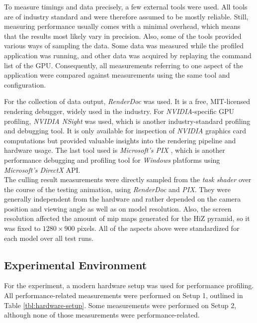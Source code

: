 To measure timings and data precisely, a few external tools were used. All tools are of industry standard 
and were therefore assumed to be mostly reliable. Still, measuring performance usually comes with a minimal 
overhead, which means that the results most likely vary in precision. Also, some of the tools provided 
various ways of sampling the data. Some data was measured while the profiled application was running, and 
other data was acquired by replaying the command list of the \ac{GPU}. Consequently, all measurements 
referring to one aspect of the application were compared against measurements using the same tool and 
configuration. \\
\enlargethispage{\baselineskip}
\enlargethispage{\baselineskip}

\noindent
For the collection of data output, \emph{RenderDoc} \cite{RenderDoc} was used. It is a free, MIT-licensed 
rendering debugger, widely used in the industry. For \emph{NVIDIA}-specific \ac{GPU} profiling, \emph{NVIDIA NSight} 
\cite{NSight} was used, which is another industry-standard profiling and debugging tool. It is only available for 
inspection of \emph{NVIDIA} graphics card computations but provided valuable insights into the rendering pipeline 
and hardware usage. The last tool used is \emph{Microsoft's PIX} \cite{PIX}, which is another performance debugging 
and profiling tool for \emph{Windows} platforms using \emph{Microsoft's DirectX} \ac{API}. \\

\noindent
The culling result measurements were directly sampled from the \emph{task shader} over the course of the testing 
animation, using \emph{RenderDoc} and \emph{PIX}. They were generally independent from the hardware and rather 
depended on the camera position and viewing angle as well as on model resolution. Also, the screen resolution 
affected the amount of mip maps generated for the \ac{HiZ} pyramid, so it was fixed to $1280 \times 900$ pixels. 
All of the aspects above were standardized for each model over all test runs.


\subsection*{Experimental Environment} \label{subsec-experimental-environment}

For the experiment, a modern hardware setup was used for performance profiling. All performance-related 
measurements were performed on Setup 1, outlined in Table \ref{tbl:hardware-setup}. Some measurements 
were performed on Setup 2, although none of those measurements were performance-related.

